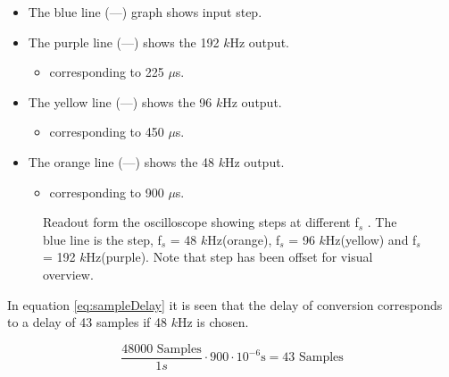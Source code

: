 \begin{itemize}
	\item The blue line (\textcolor{MATLABblue}{---}) graph shows input step.
	\item The purple line (\textcolor{MATLABpurple}{---}) shows the 192 $k$Hz output.
	\begin{itemize}
		\item corresponding to 225 $\mu$s.
	\end{itemize}
	\item The yellow line (\textcolor{MATLAByellow}{---}) shows the 96 $k$Hz output.
	\begin{itemize}
		\item corresponding to 450 $\mu$s.
	\end{itemize}
	\item The orange line (\textcolor{MATLABorange}{---}) shows the 48 $k$Hz output.
	\begin{itemize}
		\item corresponding to 900 $\mu$s.
	\end{itemize}
\end{itemize}
 

\begin{figure}[H]
	\centering
	
	\caption{Readout form the oscilloscope showing steps at different f$_s$ . The blue line is the step, f$_s$ = 48 $k$Hz(orange), f$_s$ = 96 $k$Hz(yellow) and f$_s$ = 192 $k$Hz(purple). Note that step has been offset for visual overview.}
	\label{fig:ScopeDelayExperiment}
\end{figure}

In equation \ref{eq:sampleDelay} it is seen that the delay of conversion corresponds to a delay of 43 samples if 48 $k$Hz is chosen.

\begin{equation}\label{eq:sampleDelay}
	\frac{48000\text{ Samples}}{1s} \cdot 900\cdot 10^{-6}\text{s} = 43 \text{ Samples} 
\end{equation}






